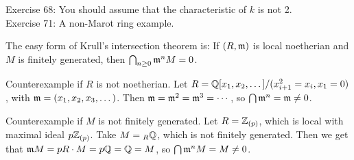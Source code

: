  \setcounter{lecture}{16}

 \noindent
 Exercise 68: You should assume that the characteristic of $k$ is not 2.\\
 Exercise 71: A non-Marot ring example.

 The easy form of Krull's intersection theorem is: If $(R,\mathfrak{m})$ is local noetherian and
 $M$ is finitely generated, then $\bigcap_{n\ge 0} \mathfrak{m}^n M=0$.

 \begin{example}
   Counterexample if $R$ is not noetherian. Let $R=\mathbb{Q}[x_1,x_2,\dots]/(x_{i+1}^2=x_i,x_1=0)$,
   with $\mathfrak{m}=(x_1,x_2,x_3,\dots)$. Then $\mathfrak{m}=\mathfrak{m}^2=\mathfrak{m}^3=\cdots$, so $\bigcap \mathfrak{m}^n=\mathfrak{m}\neq 0$.
 \end{example}
 \begin{example}
   Counterexample if $M$ is not finitely generated. Let $R=\mathbb{Z}_{(p)}$, which is local
   with maximal ideal $p\mathbb{Z}_{(p)}$. Take $M={}_{R}\mathbb{Q}$, which is not finitely generated.
   Then we get that $\mathfrak{m} M= pR\cdot M = p\mathbb{Q}=\mathbb{Q}=M$, so $\bigcap \mathfrak{m}^n M=M\neq 0$.
 \end{example}

